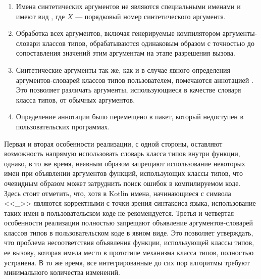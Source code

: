 \begin{enumerate}
    \item Имена синтетических аргументов не являются специальными именами и имеют вид , где $X$ --- порядковый номер синтетического аргумента.
    \item Обработка всех аргументов, включая генерируемые компилятором аргументы-словари классов типов, обрабатываются одинаковым образом с точностью до сопоставления значений этим аргументам на этапе разрешения вызова.
    \item Синтетические аргументы так же, как и в случае явного определения аргументов-словарей классов типов пользователем, помечаются аннотацией . Это позволяет различать аргументы, использующиеся в качестве словаря класса типов, от обычных аргументов. 
    \item Определение аннотации  было перемещено в пакет, который недоступен в пользовательских программах. 
\end{enumerate}
Первая и вторая особенности реализации, с одной стороны, оставляют возможность напрямую использовать словарь класса типов внутри функции, однако, в то же время, неявным образом запрещают использование некоторых имен при объявлении аргументов функций, использующих классы типов, что очевидным образом может затруднить поиск ошибок в компилируемом коде. Здесь стоит отметить, что, хотя в Kotlin имена, начинающиеся с символа <<\_>> являются корректными с точки зрения синтаксиса языка, использование таких имен в пользовательском коде не рекомендуется. Третья и четвертая особенности реализации полностью запрещают объявление аргументов-словарей классов типов в пользовательском коде в явном виде. Это позволяет утверждать, что проблема несоответствия объявления функции, использующей классы типов, ее вызову, которая имела место в прототипе механизма класса типов, полностью устранена. В то же время, все интегрированные до сих пор алгоритмы требуют минимального количества изменений.    

